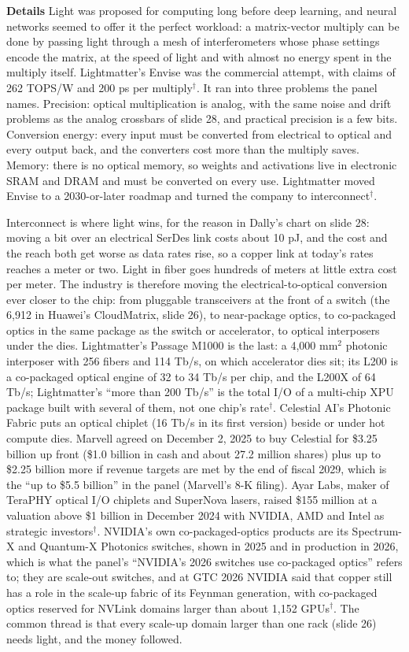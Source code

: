 \documentclass[11pt,letterpaper]{article}
\newcommand{\para}[1]{\medskip\noindent\textbf{#1}\quad}
\begin{document}
\para{Details} Light was proposed for computing long before deep learning, and neural networks seemed to offer it the perfect workload: a matrix-vector multiply can be done by passing light through a mesh of interferometers whose phase settings encode the matrix, at the speed of light and with almost no energy spent in the multiply itself. Lightmatter's Envise was the commercial attempt, with claims of 262 TOPS/W and 200 ps per multiply$^\dagger$. It ran into three problems the panel names. Precision: optical multiplication is analog, with the same noise and drift problems as the analog crossbars of slide 28, and practical precision is a few bits. Conversion energy: every input must be converted from electrical to optical and every output back, and the converters cost more than the multiply saves. Memory: there is no optical memory, so weights and activations live in electronic SRAM and DRAM and must be converted on every use. Lightmatter moved Envise to a 2030-or-later roadmap and turned the company to interconnect$^\dagger$.

Interconnect is where light wins, for the reason in Dally's chart on slide 28: moving a bit over an electrical SerDes link costs about 10 pJ, and the cost and the reach both get worse as data rates rise, so a copper link at today's rates reaches a meter or two. Light in fiber goes hundreds of meters at little extra cost per meter. The industry is therefore moving the electrical-to-optical conversion ever closer to the chip: from pluggable transceivers at the front of a switch (the 6{,}912 in Huawei's CloudMatrix, slide 26), to near-package optics, to co-packaged optics in the same package as the switch or accelerator, to optical interposers under the dies. Lightmatter's Passage M1000 is the last: a 4{,}000 mm$^2$ photonic interposer with 256 fibers and 114 Tb/s, on which accelerator dies sit; its L200 is a co-packaged optical engine of 32 to 34 Tb/s per chip, and the L200X of 64 Tb/s; Lightmatter's ``more than 200 Tb/s'' is the total I/O of a multi-chip XPU package built with several of them, not one chip's rate$^\dagger$. Celestial AI's Photonic Fabric puts an optical chiplet (16 Tb/s in its first version) beside or under hot compute dies. Marvell agreed on December 2, 2025 to buy Celestial for \$3.25 billion up front (\$1.0 billion in cash and about 27.2 million shares) plus up to \$2.25 billion more if revenue targets are met by the end of fiscal 2029, which is the ``up to \$5.5 billion'' in the panel (Marvell's 8-K filing). Ayar Labs, maker of TeraPHY optical I/O chiplets and SuperNova lasers, raised \$155 million at a valuation above \$1 billion in December 2024 with NVIDIA, AMD and Intel as strategic investors$^\dagger$. NVIDIA's own co-packaged-optics products are its Spectrum-X and Quantum-X Photonics switches, shown in 2025 and in production in 2026, which is what the panel's ``NVIDIA's 2026 switches use co-packaged optics'' refers to; they are scale-out switches, and at GTC 2026 NVIDIA said that copper still has a role in the scale-up fabric of its Feynman generation, with co-packaged optics reserved for NVLink domains larger than about 1{,}152 GPUs$^\dagger$. The common thread is that every scale-up domain larger than one rack (slide 26) needs light, and the money followed.
\end{document}
